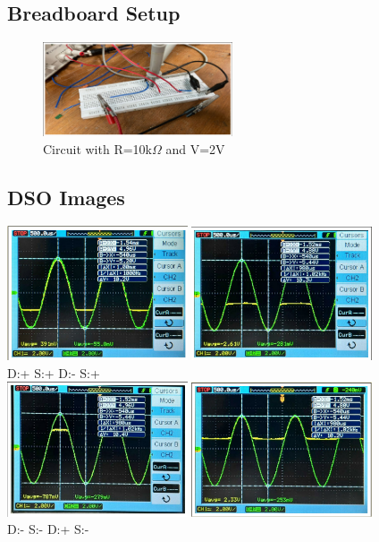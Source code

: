 \documentclass{article}
\begin{document}
\subsection{Breadboard Setup}
\begin{figure}[h!]
\centering
    \includegraphics[width=0.5\textwidth]{pic8.png}
    \caption{Circuit with R=10k$\Omega$ and V=2V}
\end{figure}
\subsection{DSO Images}
\begin{center}
    \includegraphics[width=0.4\textwidth]{pic9.png}
    \includegraphics[width=0.4\textwidth]{pic10.png}\\
    D:+ S:+ \hspace{30mm}D:- S:+\\
    \includegraphics[width=0.4\textwidth]{pic11.png}
    \includegraphics[width=0.4\textwidth]{pic12.png}\\
    D:- S:- \hspace{30mm}D:+ S:-\\
\end{center}
\end{document}
